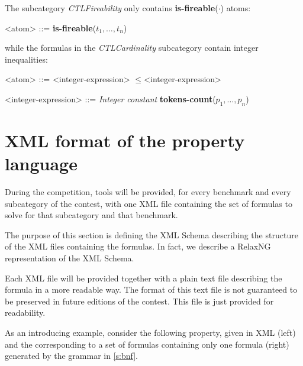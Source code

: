 \documentclass[10pt,english,a4paper]{article}
\newcommand\ctla             {\textbf{A}\xspace}
\newcommand\ctle             {\textbf{E}\xspace}
\newcommand\atomleq          {\boldmath$\leq$\xspace}
\newcommand\atomisfire[1]    {\textbf{is-fireable}(#1)}
\newcommand\atomtokenscnt[1] {\textbf{tokens-count}(#1)}
\newcommand\mysection[1]{\color{sectioncolor}\section{#1}\color{defaultcolor}}
\begin{document}
The subcategory \emph{CTLFireability} only contains \atomisfire{$\cdot$}
atoms:

\begin{grammar}
<atom> ::= \atomisfire{$t_1, \ldots, t_n$}
\end{grammar}

while the formulas in the \emph{CTLCardinality} subcategory contain
integer inequalities:

\begin{grammar}
<atom> ::= <integer-expression> \atomleq <integer-expression>

<integer-expression> ::= \textit{Integer constant}
\alt \atomtokenscnt{$p_1, \ldots, p_n$}
\end{grammar}



\mysection{XML format of the property language}
\label{s:rng}

During the competition, tools will be provided, for every benchmark and
every subcategory of the contest, with one XML file containing the set of
formulas to solve for that subcategory and that benchmark.

The purpose of this section is defining the XML Schema describing the
structure of the XML files containing the formulas.
In fact, we describe a RelaxNG representation of the XML Schema.

Each XML file will be provided together with a plain text file describing
the formula in a more readable way.
The format of this text file is not guaranteed to be preserved in future
editions of the contest. This file is just provided for readability.

As an introducing example, consider the following property, given in XML
(left) and the corresponding to a set of formulas containing only one
formula (right) generated by the grammar in \cref{s:bnf}.
\end{document}

